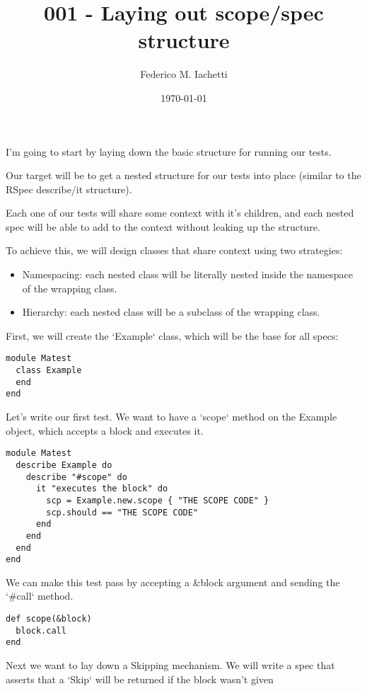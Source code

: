 \documentclass[11pt]{article}
\title{001 - Laying out scope/spec structure}
\author{Federico M. Iachetti}
\date{\today}
\begin{document}
\maketitle




I'm going to start by laying down the basic structure for running our tests.

Our target will be to get a nested structure for our tests into place (similar to the RSpec describe/it structure). 

Each one of our tests will share some context with it's children, and each nested spec will be able to add to the context without leaking up the structure.

To achieve this, we will design classes that share context using two strategies:

\begin{itemize}
\item Namespacing: each nested class will be literally nested inside the namespace of the wrapping class.
\item Hierarchy: each nested class will be a subclass of the wrapping class.
\end{itemize}

First, we will create the `Example` class, which will be the base for all specs:


\begin{verbatim}
module Matest
  class Example
  end
end
\end{verbatim}

Let's write our first test. We want to have a `scope` method on the Example object, which accepts a block and executes it.


\begin{verbatim}
module Matest
  describe Example do
    describe "#scope" do
      it "executes the block" do
        scp = Example.new.scope { "THE SCOPE CODE" }
        scp.should == "THE SCOPE CODE"
      end
    end
  end
end
\end{verbatim}

We can make this test pass by accepting a \&block argument and sending the `\#call` method.


\begin{verbatim}
def scope(&block)
  block.call
end
\end{verbatim}

Next we want to lay down a Skipping mechanism. We will write a spec that asserts that a `Skip` will be returned if the block wasn't given
\end{document}

